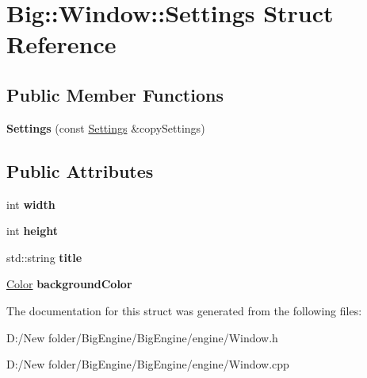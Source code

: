 \hypertarget{struct_big_1_1_window_1_1_settings}{}\section{Big\+:\+:Window\+:\+:Settings Struct Reference}
\label{struct_big_1_1_window_1_1_settings}
\subsection*{Public Member Functions}
\begin{DoxyCompactItemize}
\item 
\mbox{\label{struct_big_1_1_window_1_1_settings_aceddf73fc2274eaacb5e8e99fe5a80a2}} 
{\bfseries Settings} (const \mbox{\hyperlink{struct_big_1_1_window_1_1_settings}{Settings}} \&copy\+Settings)
\end{DoxyCompactItemize}
\subsection*{Public Attributes}
\begin{DoxyCompactItemize}
\item 
\mbox{\label{struct_big_1_1_window_1_1_settings_a1184efe58d6adb407391fee7f98e9845}} 
int {\bfseries width}
\item 
\mbox{\label{struct_big_1_1_window_1_1_settings_a08a14dfb861ae19b2a2ff22ad8727a46}} 
int {\bfseries height}
\item 
\mbox{\label{struct_big_1_1_window_1_1_settings_a4b805c71e252e54b648d4b65be2adfe7}} 
std\+::string {\bfseries title}
\item 
\mbox{\label{struct_big_1_1_window_1_1_settings_af97d82372f0f8987480fef0e115ce6bc}} 
\mbox{\hyperlink{class_big_1_1_color}{Color}} {\bfseries background\+Color}
\end{DoxyCompactItemize}


The documentation for this struct was generated from the following files\+:\begin{DoxyCompactItemize}
\item 
D\+:/\+New folder/\+Big\+Engine/\+Big\+Engine/engine/Window.\+h\item 
D\+:/\+New folder/\+Big\+Engine/\+Big\+Engine/engine/Window.\+cpp\end{DoxyCompactItemize}

